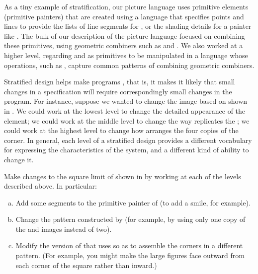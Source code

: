 As a tiny example of stratification, our picture language uses primitive
elements (primitive painters) that are created using a language that specifies
points and lines to provide the lists of line segments for
, or the shading details for a painter like
.  The bulk of our description of the picture language focused on
combining these primitives, using geometric combiners such as  and
.  We also worked at a higher level, regarding  and
 as primitives to be manipulated in a language whose operations,
such as , capture common patterns of combining geometric
combiners.

Stratified design helps make programs , that is, it makes it
likely that small changes in a specification will require correspondingly small
changes in the program.  For instance, suppose we wanted to change the image
based on  shown in .  We could work at the lowest
level to change the detailed appearance of the  element; we could
work at the middle level to change the way  replicates the
; we could work at the highest level to change how
 arranges the four copies of the corner.  In general, each
level of a stratified design provides a different vocabulary for expressing the
characteristics of the system, and a different kind of ability to change it.

\begin{exerciseGroup}
\label{Exercise 2.52}
 Make changes to the square limit
of  shown in  by working at each of the levels
described above.  In particular:

\begin{enumerate}[a.]

\item
Add some segments to the primitive  painter of 
(to add a smile, for example).

\item
Change the pattern constructed by  (for example, by using
only one copy of the  and  images instead of
two).

\item
Modify the version of  that uses  so
as to assemble the corners in a different pattern.  (For example, you might
make the large figures face outward from each corner of the square rather than
inward.)

\end{enumerate}
\end{exerciseGroup}


